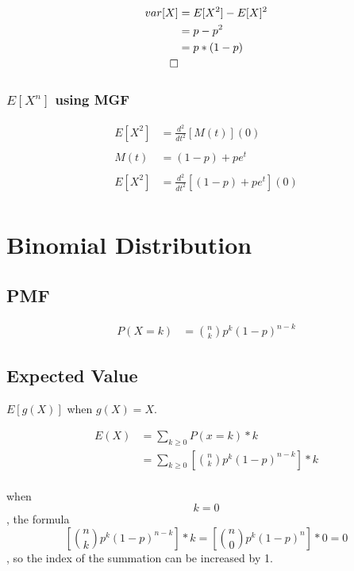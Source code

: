 \documentclass[]{book}
\begin{document}
\begin{align}
	var[X] &= E[X^2] - E[X]^2\\
	&= p - p^2\\
	&= p*(1-p)\\
	\qed
\end{align}

\subsubsection{$E[X^n]$ using MGF}

\begin{align}
E[X^2] &= \frac{d^2}{dt^2}[M(t)](0)\\
\\
M(t) &= (1-p) + pe^{t}\\
\\
E[X^2] &= \frac{d^2}{dt^2}[(1-p) + pe^{t}](0)\\
\end{align}

\section{Binomial Distribution}

\subsection{PMF}
\begin{align}
P(X=k) &= \binom{n} {k} p^k (1-p)^{n-k}
\end{align}


\subsection {Expected Value}

$E[g(X)]$ when $g(X) = X$.

\begin{align}
E(X) &= \sum_{k \geqslant 0}P(x=k)*k\\
&= \sum_{k \geqslant 0}[\binom{n} {k} p^k (1-p)^{n-k}] * k\\
\end{align}

when $$k=0$$, the formula $$[\binom{n} {k} p^k (1-p)^{n-k}] * k = [\binom{n} {0} p^k (1-p)^n] * 0 = 0$$, so the index of the summation can be increased by 1.
\end{document}
